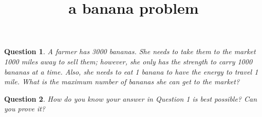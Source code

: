 \documentclass[12pt]{article}
\title{a banana problem}
\theoremstyle{plain}
\newtheorem{QQ}{Question}
\begin{document}
\maketitle

\begin{QQ}
A farmer has 3000 bananas. She needs to take them to the market 1000 miles away to sell them;
however, she only has the strength to carry 1000 bananas at a time. Also, she needs to eat 1 banana
to have the energy to travel 1 mile. What is the maximum number of bananas she can get to the
market?
\end{QQ}

\begin{QQ}
How do you know your answer in Question 1 is best possible? Can you prove it?
\end{QQ}
\end{document}
